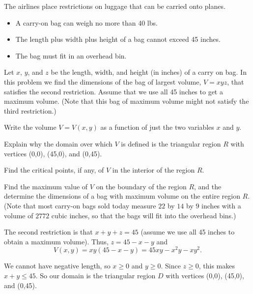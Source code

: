 \begin{exercises}
\item The airlines place restrictions on luggage that can be carried onto planes.
\begin{itemize}
\item A carry-on bag can weigh no more than 40 lbs.
\item The length plus width plus height of a bag cannot exceed 45 inches.
\item The bag must fit in an overhead bin.
\end{itemize}
Let $x$, $y$, and $z$ be the length, width, and height (in inches) of a carry on bag. In this problem we find the dimensions of the bag of largest volume, $V = xyz$, that satisfies the second restriction. Assume that we use all 45 inches to get a maximum volume. (Note that this bag of maximum volume might not satisfy the third restriction.)
	\ba
	\item Write the volume $V=V(x,y)$ as a function of just the two variables $x$ and $y$. 

	\item Explain why the domain over which $V$ is defined is the triangular region $R$ with vertices (0,0), (45,0), and (0,45). 

	\item Find the critical points, if any, of $V$ in the interior of the region $R$. 

	\item Find the maximum value of $V$ on the boundary of the region $R$, and the determine the dimensions of a bag with maximum volume on the entire region $R$. (Note that most carry-on bags sold today measure $22$ by $14$ by $9$ inches with a volume of $2772$ cubic inches, so that the bags will fit into the overhead bins.) 

	\ea
	
\begin{exerciseSolution}
	\ba
	\item The second restriction is that $x+y+z = 45$ (assume we use all 45 inches to obtain a maximum volume). Thus, $z = 45 - x - y$ and 
\[V(x,y) = xy(45-x-y) = 45xy - x^2y - xy^2.\]

	\item We cannot have negative length, so $x \geq 0$ and $y \geq 0$. Since $z \geq 0$, this makes $x+y \leq 45$. So our domain is the triangular region $D$ with vertices (0,0), (45,0), and (0,45). 


\end{exerciseSolution}
\end{exercises}
